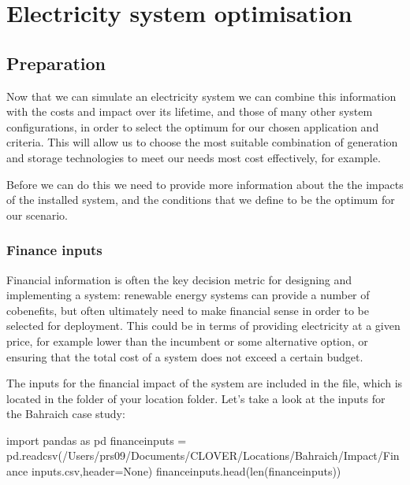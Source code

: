 \documentclass[letterpaper,10pt,english]{sphinxmanual}
\begin{document}
\section{Electricity system optimisation}
\label{\detokenize{optimisation:electricity-system-optimisation}}\label{\detokenize{optimisation::doc}}

\subsection{Preparation}
\label{\detokenize{optimisation:preparation}}
\sphinxAtStartPar
Now that we can simulate an electricity system we can combine this
information with the costs and impact over its lifetime, and those of
many other system configurations, in order to select the optimum for our
chosen application and criteria. This will allow us to choose the most
suitable combination of generation and storage technologies to meet our
needs most cost effectively, for example.

\sphinxAtStartPar
Before we can do this we need to provide more information about the the
impacts of the installed system, and the conditions that we define to be
the optimum for our scenario.


\subsubsection{Finance inputs}
\label{\detokenize{optimisation:finance-inputs}}
\sphinxAtStartPar
Financial information is often the key decision metric for designing and
implementing a system: renewable energy systems can provide a number of
co\sphinxhyphen{}benefits, but often ultimately need to make financial sense in order
to be selected for deployment. This could be in terms of providing
electricity at a given price, for example lower than the incumbent or
some alternative option, or ensuring that the total cost of a system
does not exceed a certain budget.

\sphinxAtStartPar
The inputs for the financial impact of the system are included in the
 file, which is located in the  folder of your
location folder. Let’s take a look at the inputs for the Bahraich case
study:

\begin{sphinxVerbatim}[commandchars=\\\{\}]
import pandas as pd
finance\PYGZus{}inputs = pd.read\PYGZus{}csv(\PYGZdq{}/Users/prs09/Documents/CLOVER/Locations/Bahraich/Impact/Finance inputs.csv\PYGZdq{},header=None)
finance\PYGZus{}inputs.head(len(finance\PYGZus{}inputs))
\end{sphinxVerbatim}
\end{document}
